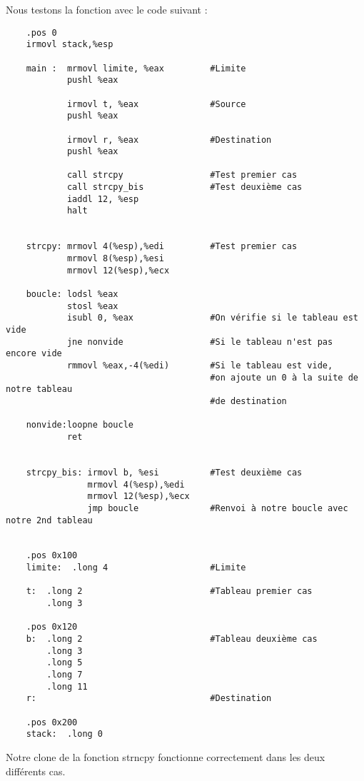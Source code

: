 \documentclass[a4paper,10pt]{article}
\begin{document}
Nous testons la fonction avec le code suivant :
\begin{verbatim}
    .pos 0
    irmovl stack,%esp

    main :  mrmovl limite, %eax         #Limite
            pushl %eax

            irmovl t, %eax              #Source
            pushl %eax

            irmovl r, %eax              #Destination
            pushl %eax

            call strcpy                 #Test premier cas
            call strcpy_bis             #Test deuxième cas
            iaddl 12, %esp
            halt


    strcpy: mrmovl 4(%esp),%edi         #Test premier cas
            mrmovl 8(%esp),%esi
            mrmovl 12(%esp),%ecx

    boucle: lodsl %eax
            stosl %eax
            isubl 0, %eax               #On vérifie si le tableau est vide
            jne nonvide                 #Si le tableau n'est pas encore vide
            rmmovl %eax,-4(%edi)        #Si le tableau est vide,
                                        #on ajoute un 0 à la suite de notre tableau
                                        #de destination

    nonvide:loopne boucle
            ret


    strcpy_bis: irmovl b, %esi          #Test deuxième cas
                mrmovl 4(%esp),%edi
                mrmovl 12(%esp),%ecx
                jmp boucle              #Renvoi à notre boucle avec notre 2nd tableau


    .pos 0x100
    limite:  .long 4                    #Limite

    t:  .long 2                         #Tableau premier cas
        .long 3

    .pos 0x120
    b:  .long 2                         #Tableau deuxième cas
        .long 3
        .long 5
        .long 7
        .long 11
    r:                                  #Destination

    .pos 0x200
    stack:  .long 0

\end{verbatim}
Notre clone de la fonction strncpy fonctionne correctement dans les deux différents cas.
\end{document}
